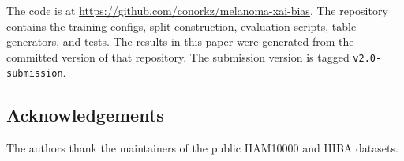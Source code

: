 The code is at \url{https://github.com/conorkz/melanoma-xai-bias}. The repository contains the training configs, split construction, evaluation scripts, table generators, and tests. The results in this paper were generated from the committed version of that repository. The submission version is tagged \texttt{v2.0-submission}.

\subsection*{Acknowledgements}

The authors thank the maintainers of the public HAM10000 and HIBA datasets.
\fi
